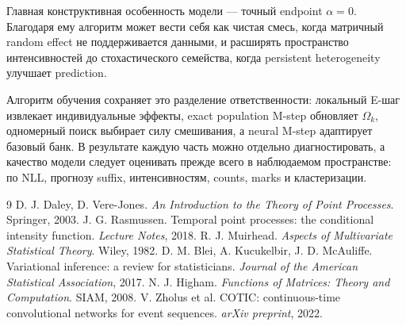 \documentclass[12pt,a4paper]{article}
\begin{document}
Главная конструктивная особенность модели --- точный endpoint \(\alpha=0\). Благодаря ему алгоритм может вести себя как чистая смесь, когда матричный random effect не поддерживается данными, и расширять пространство интенсивностей до стохастического семейства, когда persistent heterogeneity улучшает prediction.

Алгоритм обучения сохраняет это разделение ответственности: локальный E-шаг извлекает индивидуальные эффекты, exact population M-step обновляет \(\Omega_k\), одномерный поиск выбирает силу смешивания, а neural M-step адаптирует базовый банк. В результате каждую часть можно отдельно диагностировать, а качество модели следует оценивать прежде всего в наблюдаемом пространстве: по NLL, прогнозу suffix, интенсивностям, counts, marks и кластеризации.

\begin{thebibliography}{9}
 D. J. Daley, D. Vere-Jones. \textit{An Introduction to the Theory of Point Processes}. Springer, 2003.
 J. G. Rasmussen. Temporal point processes: the conditional intensity function. \textit{Lecture Notes}, 2018.
 R. J. Muirhead. \textit{Aspects of Multivariate Statistical Theory}. Wiley, 1982.
 D. M. Blei, A. Kucukelbir, J. D. McAuliffe. Variational inference: a review for statisticians. \textit{Journal of the American Statistical Association}, 2017.
 N. J. Higham. \textit{Functions of Matrices: Theory and Computation}. SIAM, 2008.
 V. Zholus et al. COTIC: continuous-time convolutional networks for event sequences. \textit{arXiv preprint}, 2022.
\end{thebibliography}
\end{document}
